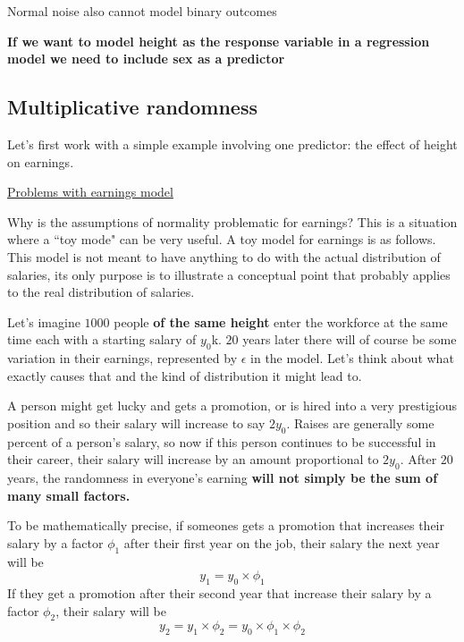 Normal noise also cannot model binary outcomes

{\bf If we want to model height as the response variable in a regression model we need to include sex as a predictor}



\subsection{Multiplicative randomness}
Let's first work with a simple example involving one predictor: the effect of height on earnings.

\begin{example}
\href{https://colab.research.google.com/drive/1bBeb3k5xEjGInFtjhB7X8B0LXqkGI0Tn#scrollTo=YGx6p6IPsIqA&line=1&uniqifier=1}{Problems with earnings model}
\end{example}

Why is the assumptions of normality problematic for earnings? This is a situation where a ``toy mode" can be very useful. A toy model for earnings is as follows. This model is not meant to have anything to do with the actual distribution of salaries, its only purpose is to illustrate a conceptual point that probably applies to the real distribution of salaries. 


Let's imagine $1000$ people {\bf of the same height} enter the workforce at the same time each with a starting salary of $y_0$k. $20$ years later there will of course be some variation in their earnings, represented by $\epsilon$ in the model. Let's think about what exactly causes that and the kind of distribution it might lead to. 

A person might get lucky and gets a promotion, or is hired into a very prestigious position and so their salary will increase to say $2y_0$. Raises are generally some percent of a person's salary, so now if this person continues to be successful in their career, their salary will increase by an amount proportional to $2y_0$. After $20$ years, the randomness in everyone's earning {\bf will not simply be the sum of many small factors.} 

To be mathematically precise, if someones gets a promotion that increases their salary by a factor $\phi_1$ after their first year on the job, their salary the next year will be 
\begin{equation}
y_1 = y_0\times \phi_1
\end{equation}
If they get a promotion after their second year that increase their salary by a factor $\phi_2$, their salary will be 
\begin{equation}
y_2 = y_1 \times \phi_2 = y_0 \times \phi_1 \times \phi_2
\end{equation}


